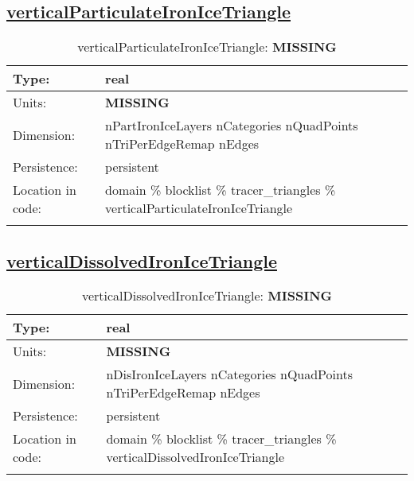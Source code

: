 \subsection[verticalParticulateIronIceTriangle]{\hyperref[sec:var_tab_tracer_triangles]{verticalParticulateIronIceTriangle}}
\label{subsec:var_sec_tracer_triangles_verticalParticulateIronIceTriangle}
\begin{center}
\begin{longtable}{| p{2.0in} | p{4.0in} |}
        \hline 
        Type: & real \\
        \hline 
        Units: & {\bf \color{red} MISSING} \\
        \hline 
        Dimension: & nPartIronIceLayers nCategories nQuadPoints nTriPerEdgeRemap nEdges \\
        \hline 
        Persistence: & persistent \\
        \hline 
         Location in code: & domain \% blocklist \% tracer\_triangles \% verticalParticulateIronIceTriangle \\
         \hline 
    \caption{verticalParticulateIronIceTriangle: {\bf \color{red} MISSING}}
\end{longtable}
\end{center}
\subsection[verticalDissolvedIronIceTriangle]{\hyperref[sec:var_tab_tracer_triangles]{verticalDissolvedIronIceTriangle}}
\label{subsec:var_sec_tracer_triangles_verticalDissolvedIronIceTriangle}
\begin{center}
\begin{longtable}{| p{2.0in} | p{4.0in} |}
        \hline 
        Type: & real \\
        \hline 
        Units: & {\bf \color{red} MISSING} \\
        \hline 
        Dimension: & nDisIronIceLayers nCategories nQuadPoints nTriPerEdgeRemap nEdges \\
        \hline 
        Persistence: & persistent \\
        \hline 
         Location in code: & domain \% blocklist \% tracer\_triangles \% verticalDissolvedIronIceTriangle \\
         \hline 
    \caption{verticalDissolvedIronIceTriangle: {\bf \color{red} MISSING}}
\end{longtable}
\end{center}
